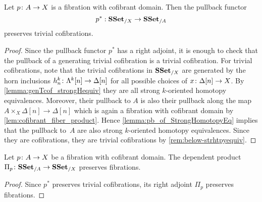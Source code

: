 \documentclass[reqno,10pt,a4paper,oneside,draft]{amsart}
\begin{document}
\begin{lemma}\label{prop:Frobenius}
Let $p \colon A \rightarrow X$ is a fibration with cofibrant domain. Then the pullback functor 
\[
p^* : \mathbf{SSet}_{/X} \rightarrow \mathbf{SSet}_{/A}
\] 
preserves  trivial cofibrations.
\end{lemma}


\begin{proof} Since the pullback functor $p^*$ has a right adjoint,  it is enough to check that the pullback of a generating trivial cofibration is a  trivial cofibration. For trivial cofibrations, note that the trivial cofibrations in $\mathbf{SSet}_{/X}$ are generated by the horn inclusions $h^k_n \colon \Lambda^{k}[n] \rightarrow \Delta[n]$ for all possible choices of $x \colon \Delta[n] \rightarrow X$. By \cref{lemma:genTcof_strongHequiv} they are all strong $k$-oriented homotopy equivalences. Moreover, their pullback to $A$ is also their pullback along the map $A \times_X \Delta[n] \rightarrow \Delta[n]$ which is again a fibration with cofibrant domain by \cref{lem:cofibrant_fiber_product}. Hence  \cref{lemma:pb_of_StrongHomotopyEq} implies that the pullback 
to~$A$ are also strong $k$-oriented homotopy equivalences. Since they are cofibrations, they are 
trivial cofibrations by \cref{rem:below-strhtpyequiv}.
\end{proof}



\begin{theorem}\label{cor:Pi_types_are_fibrant}
Let $p \colon A \rightarrow X$ be a fibration with cofibrant domain. The dependent product $\Pi_p \colon \mathbf{SSet}_{/A} \to \mathbf{SSet}_{/X}$ preserves  fibrations.
\end{theorem}

\begin{proof}
Since $p^*$ preserves  trivial cofibrations, its right adjoint $\Pi_p$ preserves fibrations.
\end{proof}





\end{document}
